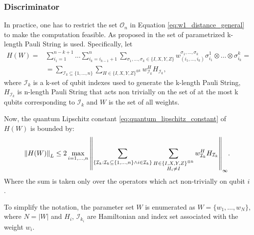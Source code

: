 \subsubsection{Discriminator}
In practice, one has to restrict the set $\mathcal{O}_n$ in Equation
\eqref{eq:w1_distance_general} to make the computation feasible.
As proposed in \cite{kiani2021quantum} the set of parametrized k-length Pauli
String is used. Specifically, let
\begin{equation}
\begin{split}
  \label{eq:parametrized_hamiltonian}
  H(W) = & \sum_{i_1 = 1}^{n-k+1} \ldots \sum_{i_k = i_{k-1} + 1}^{n}\sum_{\sigma_1, \ldots, \sigma_k \in \{I, X, Y, Z\}} w^{\sigma_1,
    \ldots, \sigma_k}_{(i_1, \ldots, i_k)} \sigma^1_{i_1} \otimes \ldots \otimes \sigma^k_{i_k}  = \\
  & = \sum_{\mathcal{I}_k \subseteq \{1, \ldots, n \}} \sum_{H \in \{ I,X,Y,Z \}^{\otimes k}} w_{\mathcal{I}_k}^HH_{\mathcal{I}_k},
\end{split}
\end{equation}
where $\mathcal{I}_k$ is a k-set of qubit indexes used to generate the k-length
Pauli String, $H_{\mathcal{I}_k}$ is n-length Pauli String that acts non
trivially on the set of at the most k qubits
corresponding to $\mathcal{I}_k$ and $W$ is the set of all weights.

Now, the quantum Lipschitz constant \eqref{eq:quantum_lipschitz_constant} of $H(W)$ is bounded by:
\begin{equation}
  \label{eq:quantum_lipschitz_bound}
  \left\lVert H(W)\right\rVert_L \leq 2 \max_{i = 1,\ldots,n}{\left\lVert\sum_{\{ \mathcal{I}_k: \mathcal{I}_k \subseteq \{1, \ldots, n \} \land i \in \mathcal{I}_k \}}
      \sum_{\substack{H \in \{ I,X,Y,Z \}^{\otimes k} \\
        H_{i} \neq I
      }} w_{\mathcal{I}_k}^HH_{\mathcal{I}_k} \right\rVert_{\infty}}.
\end{equation}
Where the sum is taken only over the operators which act non-trivially on qubit
$i$ \cite{kiani2021quantum}. 

To simplify the notation, the parameter set $W$ is enumerated as $W=\{w_1,
  \ldots, w_N\}$, where $N=|W|$ and $H_i$, $\mathcal{I}_{k_i}$ are Hamiltonian and index set
associated with the weight $w_i$.

